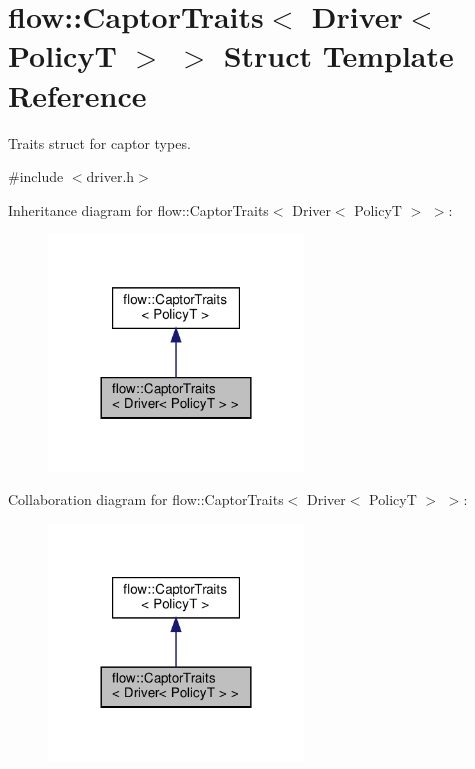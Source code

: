 \hypertarget{structflow_1_1_captor_traits_3_01_driver_3_01_policy_t_01_4_01_4}{}\section{flow\+:\+:Captor\+Traits$<$ Driver$<$ PolicyT $>$ $>$ Struct Template Reference}
\label{structflow_1_1_captor_traits_3_01_driver_3_01_policy_t_01_4_01_4}


Traits struct for captor types.  




{\ttfamily \#include $<$driver.\+h$>$}



Inheritance diagram for flow\+:\+:Captor\+Traits$<$ Driver$<$ PolicyT $>$ $>$\+:\nopagebreak
\begin{figure}[H]
\begin{center}
\leavevmode
\includegraphics[width=192pt]{structflow_1_1_captor_traits_3_01_driver_3_01_policy_t_01_4_01_4__inherit__graph}
\end{center}
\end{figure}


Collaboration diagram for flow\+:\+:Captor\+Traits$<$ Driver$<$ PolicyT $>$ $>$\+:\nopagebreak
\begin{figure}[H]
\begin{center}
\leavevmode
\includegraphics[width=192pt]{structflow_1_1_captor_traits_3_01_driver_3_01_policy_t_01_4_01_4__coll__graph}
\end{center}
\end{figure}



